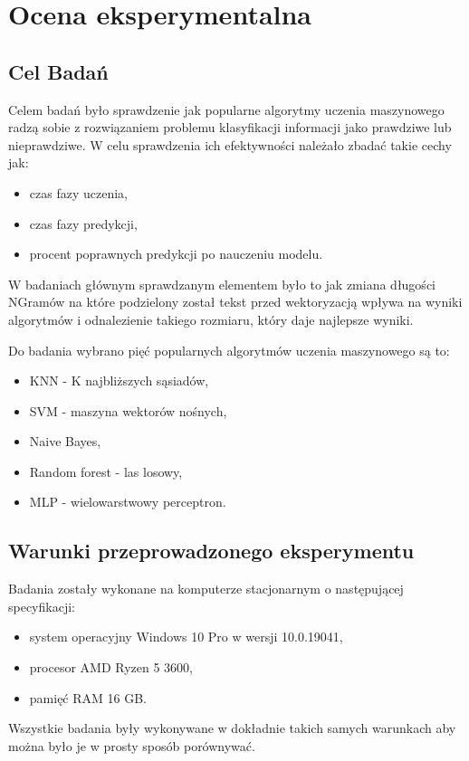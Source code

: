 \chapter{Ocena eksperymentalna}
\section{Cel Badań}
Celem badań było sprawdzenie jak popularne algorytmy uczenia maszynowego radzą sobie z rozwiązaniem problemu 
klasyfikacji informacji jako prawdziwe lub nieprawdziwe. W celu sprawdzenia ich efektywności należało zbadać
takie cechy jak:
\begin{itemize}
    \item czas fazy uczenia,
    \item czas fazy predykcji,
    \item procent poprawnych predykcji po nauczeniu modelu.
\end{itemize}
W badaniach głównym sprawdzanym elementem było to jak zmiana długości NGramów na które podzielony
został tekst przed wektoryzacją wpływa na wyniki algorytmów i odnalezienie takiego rozmiaru, który
daje najlepsze wyniki. 

Do badania wybrano pięć popularnych algorytmów uczenia maszynowego są to: 
\begin{itemize}
    \item KNN - K najbliższych sąsiadów,
    \item SVM - maszyna wektorów nośnych,
    \item Naive Bayes,
    \item Random forest - las losowy,
    \item MLP - wielowarstwowy perceptron.
\end{itemize} 
\section{Warunki przeprowadzonego eksperymentu}
Badania zostały wykonane na komputerze stacjonarnym o następującej specyfikacji:
\begin{itemize}
    \item system operacyjny Windows 10 Pro w wersji 10.0.19041,
    \item procesor AMD Ryzen 5 3600,
    \item pamięć RAM 16 GB.
\end{itemize}
Wszystkie badania były wykonywane w dokładnie takich samych warunkach aby można było 
je w prosty sposób porównywać. 

